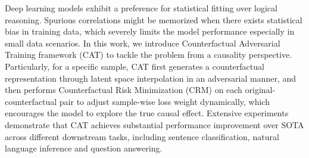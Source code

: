 Deep learning models exhibit a preference for statistical fitting over logical reasoning. Spurious correlations might be memorized when there exists statistical bias in training data, which severely limits the model performance especially in small data scenarios. In this work, we introduce Counterfactual Adversarial Training framework (CAT) to tackle the problem from a causality perspective. Particularly, for a specific sample, CAT first generates a counterfactual representation through latent space interpolation in an adversarial manner, and then performs Counterfactual Risk Minimization (CRM) on each original-counterfactual pair to adjust sample-wise loss weight dynamically, which encourages the model to explore the true causal effect. Extensive experiments demonstrate that CAT achieves substantial performance improvement over SOTA across different downstream tasks, including sentence classification, natural language inference and question answering.
